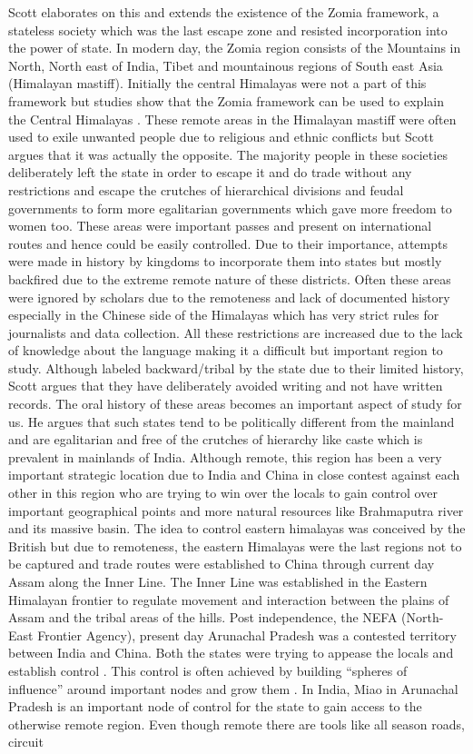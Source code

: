 Scott \citep{jamesscott} elaborates on this and extends the existence of the Zomia framework, a stateless society which was the last escape zone and resisted incorporation into the power of state. In modern day, the Zomia region consists of the Mountains in North, North east of India, Tibet and mountainous regions of South east Asia (Himalayan mastiff). Initially the central Himalayas were not a part of this framework but studies  show that the Zomia framework can be used to explain the Central Himalayas \citep{shneiderman2010central}. These remote areas in the Himalayan mastiff were often used to exile unwanted people due to religious and ethnic conflicts but Scott argues that it was actually the opposite. The majority people in these societies deliberately left the state in order to escape it and do trade without any restrictions and escape the crutches of hierarchical divisions and feudal governments to form more egalitarian governments which gave more freedom to women too. These areas were important passes and present on international routes and hence could be easily controlled. Due to their importance, attempts were made in history by kingdoms to incorporate them into states but mostly backfired due to the extreme remote nature of these districts. Often these areas were ignored by scholars due to the remoteness and lack of documented history especially in the Chinese side of the Himalayas which has very strict rules for journalists and data collection. All these restrictions are increased due to the lack of knowledge about the language making it a difficult but important region to study. Although labeled backward/tribal by the state due to their limited history, Scott argues that they have deliberately avoided writing and not have written records. The oral history of these areas becomes an important aspect of study for us. He argues that such states tend to be politically different from the mainland and are egalitarian and free of the crutches of hierarchy like caste which is prevalent in mainlands of India. Although remote, this region has been a very important strategic location due to India and China in close contest against each other in this region who are trying to win over the locals to gain control over important geographical points  and more natural resources like Brahmaputra river and its massive basin. The idea to control eastern himalayas was conceived by the British but due to remoteness, the eastern Himalayas were the last regions not to be captured and trade routes were established to China through current day Assam along the Inner Line. The Inner Line was established in the Eastern Himalayan frontier to regulate movement and interaction between the plains of Assam and the tribal areas of the hills. Post independence, the NEFA (North-East Frontier Agency), present day Arunachal Pradesh was a contested territory between India and China. Both the states were trying to appease the locals and establish control \citep{guyot2017shadow}. This control is often achieved by building \enquote{spheres of influence} around important nodes and grow them \citep{Farrelly_2013b}. In India, Miao in Arunachal Pradesh is an important node of control for the state to gain access to the otherwise remote region. Even though remote there are tools like all season roads, circuit 